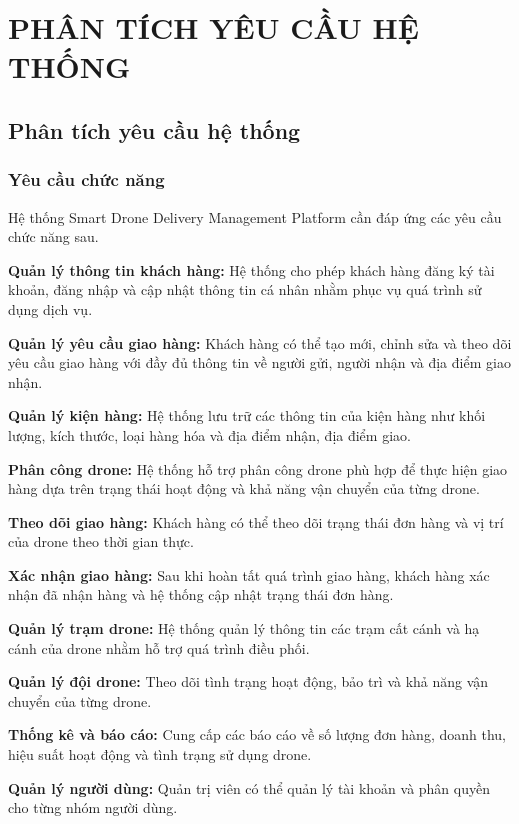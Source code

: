 \chapter{PHÂN TÍCH YÊU CẦU HỆ THỐNG}

\section{Phân tích yêu cầu hệ thống}

\subsection{Yêu cầu chức năng}

Hệ thống Smart Drone Delivery Management Platform cần đáp ứng các yêu cầu chức năng sau.

\textbf{Quản lý thông tin khách hàng:} Hệ thống cho phép khách hàng đăng ký tài khoản, đăng nhập và cập nhật thông tin cá nhân nhằm phục vụ quá trình sử dụng dịch vụ.

\textbf{Quản lý yêu cầu giao hàng:} Khách hàng có thể tạo mới, chỉnh sửa và theo dõi yêu cầu giao hàng với đầy đủ thông tin về người gửi, người nhận và địa điểm giao nhận.

\textbf{Quản lý kiện hàng:} Hệ thống lưu trữ các thông tin của kiện hàng như khối lượng, kích thước, loại hàng hóa và địa điểm nhận, địa điểm giao.

\textbf{Phân công drone:} Hệ thống hỗ trợ phân công drone phù hợp để thực hiện giao hàng dựa trên trạng thái hoạt động và khả năng vận chuyển của từng drone.

\textbf{Theo dõi giao hàng:} Khách hàng có thể theo dõi trạng thái đơn hàng và vị trí của drone theo thời gian thực.

\textbf{Xác nhận giao hàng:} Sau khi hoàn tất quá trình giao hàng, khách hàng xác nhận đã nhận hàng và hệ thống cập nhật trạng thái đơn hàng.

\textbf{Quản lý trạm drone:} Hệ thống quản lý thông tin các trạm cất cánh và hạ cánh của drone nhằm hỗ trợ quá trình điều phối.

\textbf{Quản lý đội drone:} Theo dõi tình trạng hoạt động, bảo trì và khả năng vận chuyển của từng drone.

\textbf{Thống kê và báo cáo:} Cung cấp các báo cáo về số lượng đơn hàng, doanh thu, hiệu suất hoạt động và tình trạng sử dụng drone.

\textbf{Quản lý người dùng:} Quản trị viên có thể quản lý tài khoản và phân quyền cho từng nhóm người dùng.


